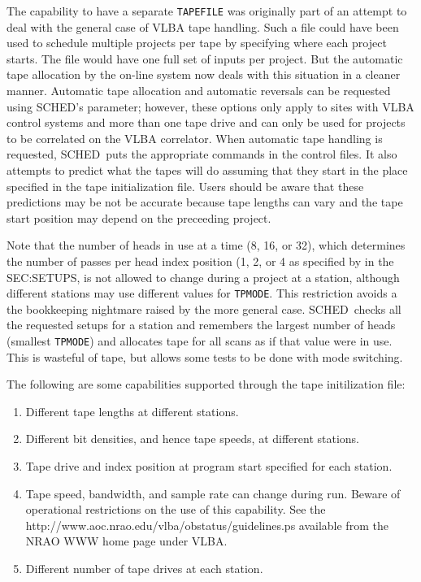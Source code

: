 \documentclass{report}
\newcommand{\sched}{{\sc SCHED}}
\newcommand{\schedb}{{\sc SCHED~}}
\begin{document}
The capability to have a separate {\tt TAPEFILE} was originally part
of an attempt to deal with the general case of VLBA tape handling.
Such a file could have been used to schedule multiple projects per
tape by specifying where each project starts.  The file would have one
full set of inputs per project.  But the automatic tape allocation by
the on-line system now deals with this situation in a cleaner manner.
Automatic tape allocation and automatic reversals can be requested
using \sched's  parameter;
however, these options only apply to sites with VLBA control systems
and more than one tape drive and can only be used for projects to be
correlated on the VLBA correlator.  When automatic tape handling is
requested, \schedb puts the appropriate commands in the control files.
It also attempts to predict what the tapes will do assuming that they
start in the place specified in the tape initialization file.  Users
should be aware that these predictions may be not be accurate because
tape lengths can vary and the tape start position may depend on the
preceeding project.

Note that the number of heads in use at a time (8, 16, or 32), which
determines the number of passes per head index position (1, 2, or 4 as
specified by  in the  {SEC:SETUPS}, is not allowed to change during a project
at a station, although different stations may use different values for
{\tt TPMODE}.  This restriction avoids a the bookkeeping nightmare
raised by the more general case.  \schedb checks all the requested
setups for a station and remembers the largest number of heads
(smallest {\tt TPMODE}) and allocates tape for all scans as if that
value were in use.  This is wasteful of tape, but allows some tests to
be done with mode switching.

The following are some capabilities supported through the tape initilization
file:

\begin{enumerate}
\item Different tape lengths at different stations.

\item Different bit densities, and hence tape speeds, at different
stations.

\item Tape drive and index position at program start specified for
each station.

\item Tape speed, bandwidth, and sample rate can change during run.
Beware of operational restrictions on the use of this capability.
See the 
{http://www.aoc.nrao.edu/vlba/obstatus/guidelines.ps}
available from the NRAO WWW home page under VLBA.

\item Different number of tape drives at each station.
\end{enumerate}
\end{document}
